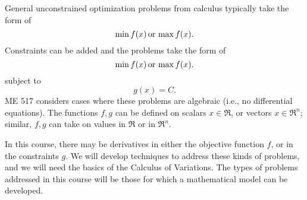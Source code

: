 General unconstrained optimization problems from calculus typically take the form of
\begin{equation}
\min f(x)\, {\rm or}\, \max f(x).
\end{equation}
Constraints can be added and the problems take the form of 
$$
\min f(x)\, {\rm or}\, \max f(x).
$$ 
subject to
\begin{equation}
g(x) = C.
\end{equation}
ME 517 considers cases where these problems are algebraic (i.e., no differential equations). The functions $f, g$ can be defined on scalars $x\in \Re$, or vectors $x \in \Re^n$; similar, $f, g$ can take on values in $\Re$ or in $\Re^n$.

In this course, there may be derivatives in either the objective function $f$, or in the constraints $g$. We will develop techniques to address these kinds of problems, and we will need the basics of the Calculus of Variations. The types of problems addressed in this course will be those for which a mathematical model can be developed. 

